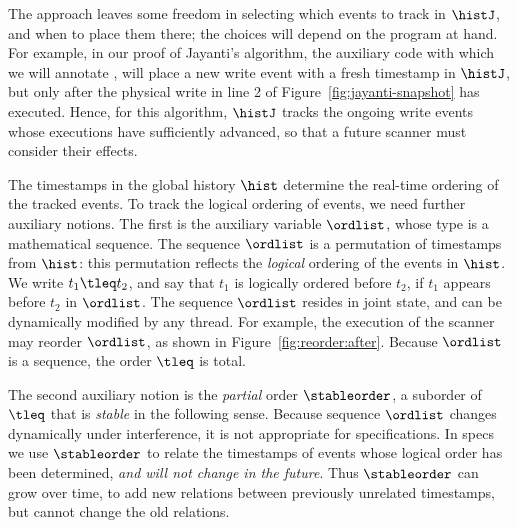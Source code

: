 The approach leaves some freedom in selecting which events to track in
$\histJ$, and when to place them there; the choices will depend on the
program at hand. For example, in our proof of Jayanti's algorithm, the
auxiliary code with which we will annotate \jywrite, will place a new
write event with a fresh timestamp in $\histJ$, but only after the
physical write in line 2 of Figure~\ref{fig:jayanti-snapshot} has
executed. Hence, for this algorithm, $\histJ$ tracks the ongoing write
events whose executions have sufficiently advanced, so that a future
scanner must consider their effects.




The timestamps in the global history $\hist$ determine the real-time
ordering of the tracked events. To track the logical ordering of
events, we need further auxiliary notions.
%
The first is the auxiliary variable $\ordlist$, whose type is a
mathematical sequence. The sequence $\ordlist$ is a permutation of
timestamps from $\hist$: this permutation reflects the \emph{logical}
ordering of the events in $\hist$. We write $t_1 \tleq t_2$, and say
that $t_1$ is logically ordered before $t_2$, if $t_1$ appears before
$t_2$ in $\ordlist$. The sequence $\ordlist$ resides in joint state,
and can be dynamically modified by any thread. For example, the
execution of the scanner may reorder $\ordlist$, as shown in
Figure~\ref{fig:reorder:after}. Because $\ordlist$ is a sequence, the
order $\tleq$ is total.

%
%

The second auxiliary notion is the \emph{partial} order
$\stableorder$, a suborder of $\tleq$ that is \emph{stable} in the
following sense. Because sequence $\ordlist$ changes dynamically under
interference, it is not appropriate for specifications. In specs
we use $\stableorder$ to relate the timestamps of events whose logical
order has been determined, \emph{and will not change in the
  future}. Thus $\stableorder$ can grow over time, to add new
relations between previously unrelated timestamps, but cannot change
the old relations.


